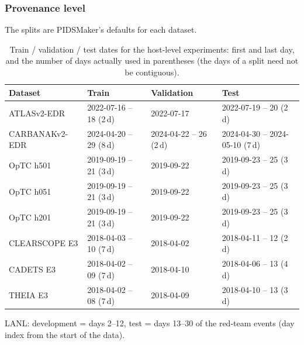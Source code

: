 \subsubsection{Provenance level}
The splits are PIDSMaker's defaults for each dataset.
\begin{table}[!htbp]\centering\footnotesize\setlength{\tabcolsep}{3pt}
\caption{Train / validation / test dates for the host-level experiments: first and last day, and the number of days actually used in parentheses (the days of a split need not be contiguous).}
\begin{tabularx}{\textwidth}{@{}lYYY@{}}
\toprule
Dataset & Train & Validation & Test \\
\midrule
ATLASv2-EDR & 2022-07-16 -- 18 (2\,d) & 2022-07-17 & 2022-07-19 -- 20 (2\,d) \\
CARBANAKv2-EDR & 2024-04-20 -- 29 (8\,d) & 2024-04-22 -- 26 (2\,d) & 2024-04-30 -- 2024-05-10 (7\,d) \\
OpTC h501 & 2019-09-19 -- 21 (3\,d) & 2019-09-22 & 2019-09-23 -- 25 (3\,d) \\
OpTC h051 & 2019-09-19 -- 21 (3\,d) & 2019-09-22 & 2019-09-23 -- 25 (3\,d) \\
OpTC h201 & 2019-09-19 -- 21 (3\,d) & 2019-09-22 & 2019-09-23 -- 25 (3\,d) \\
CLEARSCOPE E3 & 2018-04-03 -- 10 (7\,d) & 2018-04-02 & 2018-04-11 -- 12 (2\,d) \\
CADETS E3 & 2018-04-02 -- 09 (7\,d) & 2018-04-10 & 2018-04-06 -- 13 (4\,d) \\
THEIA E3 & 2018-04-02 -- 08 (7\,d) & 2018-04-09 & 2018-04-10 -- 13 (3\,d) \\
\bottomrule
\end{tabularx}
\end{table}
LANL: development = days 2--12, test = days 13--30 of the red-team events (day index from the start of the data).

